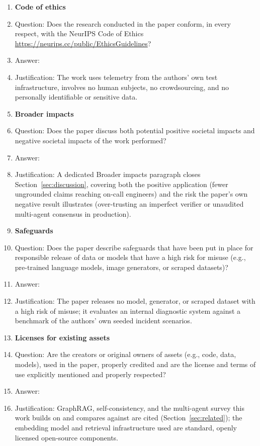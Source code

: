 \begin{enumerate}
\item {\bf Code of ethics}
    \item[] Question: Does the research conducted in the paper conform, in every respect, with the NeurIPS Code of Ethics \url{https://neurips.cc/public/EthicsGuidelines}?
    \item[] Answer: \answerYes{}
    \item[] Justification: The work uses telemetry from the authors' own test infrastructure, involves no human subjects, no crowdsourcing, and no personally identifiable or sensitive data.

\item {\bf Broader impacts}
    \item[] Question: Does the paper discuss both potential positive societal impacts and negative societal impacts of the work performed?
    \item[] Answer: \answerYes{}
    \item[] Justification: A dedicated Broader impacts paragraph closes Section~\ref{sec:discussion}, covering both the positive application (fewer ungrounded claims reaching on-call engineers) and the risk the paper's own negative result illustrates (over-trusting an imperfect verifier or unaudited multi-agent consensus in production).

\item {\bf Safeguards}
    \item[] Question: Does the paper describe safeguards that have been put in place for responsible release of data or models that have a high risk for misuse (e.g., pre-trained language models, image generators, or scraped datasets)?
    \item[] Answer: \answerNA{}
    \item[] Justification: The paper releases no model, generator, or scraped dataset with a high risk of misuse; it evaluates an internal diagnostic system against a benchmark of the authors' own seeded incident scenarios.

\item {\bf Licenses for existing assets}
    \item[] Question: Are the creators or original owners of assets (e.g., code, data, models), used in the paper, properly credited and are the license and terms of use explicitly mentioned and properly respected?
    \item[] Answer: \answerYes{}
    \item[] Justification: GraphRAG, self-consistency, and the multi-agent survey this work builds on and compares against are cited (Section~\ref{sec:related}); the embedding model and retrieval infrastructure used are standard, openly licensed open-source components.


\end{enumerate}
